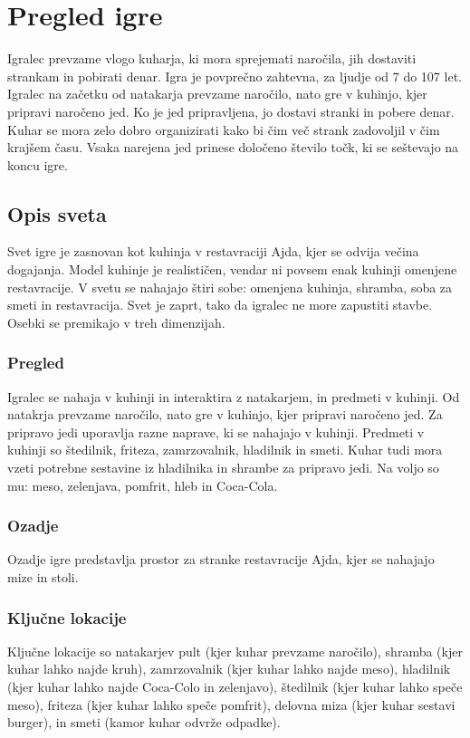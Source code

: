 \documentclass[a4paper]{article}
\begin{document}
\section{Pregled igre}
Igralec prevzame vlogo kuharja, ki mora sprejemati naročila, jih dostaviti strankam in pobirati denar.
Igra je povprečno zahtevna, za ljudje od 7 do 107 let.
Igralec na začetku od natakarja prevzame naročilo, nato gre v kuhinjo, kjer pripravi naročeno jed. Ko je jed pripravljena, jo dostavi stranki in pobere denar.
Kuhar se mora zelo dobro organizirati kako bi čim več strank zadovoljil v čim krajšem času.
Vsaka narejena jed prinese določeno število točk, ki se seštevajo na koncu igre.

\subsection{Opis sveta}
Svet igre je zasnovan kot kuhinja v restavraciji Ajda, kjer se odvija večina dogajanja. Model kuhinje je realističen, vendar ni povsem enak kuhinji omenjene restavracije. 
V svetu se nahajajo štiri sobe: omenjena kuhinja, shramba, soba za smeti in restavracija. Svet je zaprt, tako da igralec ne more zapustiti stavbe.
Osebki se premikajo v treh dimenzijah.

\subsubsection{Pregled}
Igralec se nahaja v kuhinji in interaktira z natakarjem, in predmeti v kuhinji. Od natakrja prevzame naročilo, nato gre v kuhinjo, kjer pripravi naročeno jed. 
Za pripravo jedi uporavlja razne naprave, ki se nahajajo v kuhinji. Predmeti v kuhinji so štedilnik, friteza, zamrzovalnik, hladilnik in smeti. 
Kuhar tudi mora vzeti potrebne sestavine iz hladilnika in shrambe za pripravo jedi. Na voljo so mu: meso, zelenjava, pomfrit, hleb in Coca-Cola.

\subsubsection{Ozadje}
Ozadje igre predstavlja prostor za stranke restavracije Ajda, kjer se nahajajo mize in stoli.

\subsubsection{Ključne lokacije}
Ključne lokacije so natakarjev pult (kjer kuhar prevzame naročilo), shramba (kjer kuhar lahko najde kruh), zamrzovalnik (kjer kuhar lahko najde meso), hladilnik (kjer kuhar lahko najde Coca-Colo in zelenjavo),
štedilnik (kjer kuhar lahko speče meso), friteza (kjer kuhar lahko speče pomfrit), delovna miza (kjer kuhar sestavi burger), in smeti (kamor kuhar odvrže odpadke). 
\end{document}
